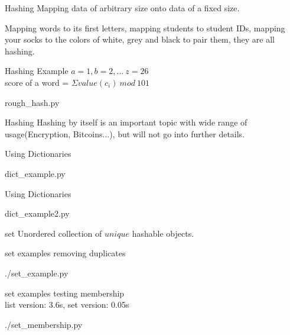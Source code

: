 \documentclass{beamer}
\begin{document}
\begin{frame}{Hashing}
  Mapping data of arbitrary size onto data of a fixed size.

  Mapping words to its first letters, mapping students to student IDs,
  mapping your socks to the colors of white, grey and black to pair them, they are all hashing.
\end{frame}

\begin{frame}{Hashing Example}
  $a=1, b=2, ...\ z=26$\\
  score of a word = $\Sigma value(c_i)\ mod\ 101$
  \begin{lstinputlisting}
    {rough_hash.py}
  \end{lstinputlisting}
\end{frame}

\begin{frame}{Hashing}
  Hashing by itself is an important topic with wide range of usage(Encryption,
  Bitcoins...), but will not go into further details.
\end{frame}

\begin{frame}{Using Dictionaries}
  \begin{lstinputlisting}
    {dict_example.py}
  \end{lstinputlisting}
\end{frame}

\begin{frame}{Using Dictionaries}
  \begin{lstinputlisting}
    {dict_example2.py}
  \end{lstinputlisting}
\end{frame}

\begin{frame}{set}
  Unordered collection of $unique$ hashable objects.\\
\end{frame}

\begin{frame}{set examples}
  removing duplicates
  \begin{lstinputlisting}
    {./set_example.py}
  \end{lstinputlisting}
\end{frame}

\begin{frame}{set examples}
  testing membership\\
  list version: 3.6s, set version: 0.05s
  \begin{lstinputlisting}
    {./set_membership.py}
  \end{lstinputlisting}
\end{frame}
\end{document}

